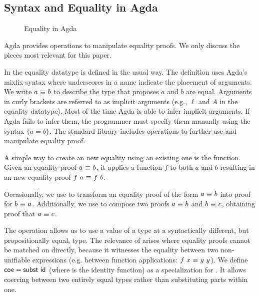 \documentclass[manuscript,screen,review,anonymous]{acmart}
\begin{document}
\subsection{Syntax and Equality in Agda}
\label{sec:eqreason}
\begin{figure}[tp]
  \begin{minipage}[t]{0.45\linewidth}
    \SFEQ
    \SFcong
  \end{minipage}
  \begin{minipage}[t]{0.45\linewidth}
    \SFsubst
    \SFcoe
  \end{minipage}
  \caption{Equality in Agda}
  \label{fig:eq-agda}
\end{figure}
Agda provides operations to manipulate equality proofs.
We only discuss the pieces most relevant for this paper.

In  the equality datatype is defined in the usual
way. 
The definition uses Agda's mixfix syntax where underscores in a name indicate the
placement of arguments. 
We write $a ~\AgdaDatatype{$\equiv$}~ b$ to describe the type 
that proposes $a$ and $b$ are equal.
Arguments in curly brackets are referred to as implicit arguments 
(e.g., $\ell$ and $A$ in the equality datatype). 
Most of the time Agda is able to infer implicit arguments. 
If Agda fails to infer them,
the programmer must specify them manually using the syntax $\{a = b\}$.
The standard library includes operations to further use 
and manipulate equality proof.

A simple way to create an new equality using an existing one 
is the  function.
Given an equality proof  
$a ~\AgdaDatatype{$\equiv$}~ b$, it applies a function $f$ to both $a$ and $b$
resulting in an new equality proof $f~a ~\AgdaDatatype{$\equiv$}~ f~b$.

Occasionally, we use {} to transform 
an equality proof of the form $a ~\AgdaDatatype{$\equiv$}~ b$ into
proof for $b ~\AgdaDatatype{$\equiv$}~ a$. Additionally, we 
use {} to compose two proofs
$a ~\AgdaDatatype{$\equiv$}~ b$ and $b ~\AgdaDatatype{$\equiv$}~ c$,
obtaining proof that $a ~\AgdaDatatype{$\equiv$}~ c$.

The {} operation allows us to use a value of 
a type at a syntactically different, but propositionally equal, type.
The relevance of {} arises where equality proofs cannot be matched
on directly, because it witnesses the equality between two non-unifiable
expressions (e.g. between function applications: $f~x~\AgdaDatatype{$\equiv$}~g~y$).
We define $\AgdaFunction{coe}=\AgdaFunction{subst}~\AgdaFunction{id}$ 
(where  is the identity function) 
as a specialization for {}.
It allows coercing between two entirely equal types 
rather than substituting parts within one.
\end{document}
